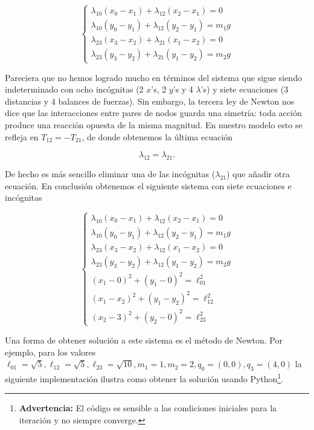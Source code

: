 \documentclass[
]{book}
\theoremstyle{definition}
\theoremstyle{definition}
\theoremstyle{definition}
\theoremstyle{definition}
\theoremstyle{remark}
\begin{document}
\[
\begin{cases}
\lambda_{10}(x_{0}-x_{1})+\lambda_{12}(x_{2}-x_{1}) = 0\\
\lambda_{10}(y_{0}-y_{1})+\lambda_{12}(y_{2}-y_{1}) = m_{1}g\\
\lambda_{23}(x_{3}-x_{2})+\lambda_{21}(x_{1}-x_{2}) = 0\\
\lambda_{23}(y_{3}-y_{2})+\lambda_{21}(y_{1}-y_{2}) = m_{2}g
\end{cases}
\]

Pareciera que no hemos logrado mucho en términos del sistema que sigue siendo indeterminado con ocho incógnitas (2 \(x\)'s, 2 \(y\)'s y 4 \(\lambda\)'s) y siete ecuaciones (3 distancias y 4 balances de fuerzas). Sin embargo, la tercera ley de Newton nos dice que las interacciones entre pares de nodos guarda una simetría: toda acción produce una reacción opuesta de la misma magnitud. En nuestro modelo esto se refleja en \(T_{12} = -T_{21}\), de donde obtenemos la última ecuación

\[
\lambda_{12}=\lambda_{21}.
\]

De hecho es más sencillo eliminar una de las incógnitas (\(\lambda_{21}\)) que añadir otra ecuación. En conclusión obtenemos el siguiente sistema con siete ecuaciones e incógnitas

\[
\begin{cases}
\lambda_{10}(x_{0}-x_{1})+\lambda_{12}(x_{2}-x_{1}) = 0\\
\lambda_{10}(y_{0}-y_{1})+\lambda_{12}(y_{2}-y_{1}) = m_{1}g\\
\lambda_{23}(x_{3}-x_{2})+\lambda_{12}(x_{1}-x_{2}) = 0\\
\lambda_{23}(y_{3}-y_{2})+\lambda_{12}(y_{1}-y_{2}) = m_{2}g\\
(x_1-0)^2 + (y_1-0)^2 = \ell_{01}^2\\
(x_1-x_2)^2 + (y_1-y_2)^2 = \ell_{12}^2\\
(x_2-3)^2 + (y_2-0)^2 = \ell_{23}^2
\end{cases}
\]

Una forma de obtener solución a este sistema es el método de Newton. Por ejemplo, para los valores \(\ell_{01}=\sqrt{5}, \ell_{12}=\sqrt{5}, \ell_{23}=\sqrt{10}, m_1=1, m_2=2, q_0=(0,0), q_3=(4,0)\) la siguiente implementación ilustra como obtener la solución usando Python\footnote{\textbf{Advertencia:} El código es sensible a las condiciones iniciales para la iteración y no siempre converge.}.
\end{document}
